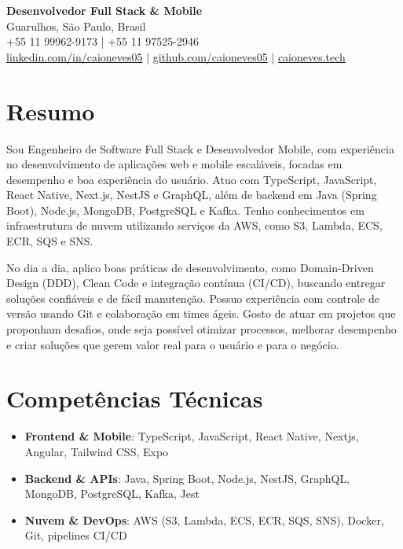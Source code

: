 \documentclass[11pt,letterpaper]{article}
\begin{document}
\begin{center}
    \textbf{\Large Desenvolvedor Full Stack \& Mobile} \\
    \vspace{5pt}
    Guarulhos, São Paulo, Brasil \\
    +55 11 99962-9173 | +55 11 97525-2946 \\
    \href{https://www.linkedin.com/in/caioneves05}{linkedin.com/in/caioneves05} |
    \href{https://github.com/caioneves05}{github.com/caioneves05} |
    \href{http://caioneves.tech}{caioneves.tech}
\end{center}

\section{Resumo}
Sou Engenheiro de Software Full Stack e Desenvolvedor Mobile, com experiência no desenvolvimento de aplicações web e mobile escaláveis, focadas em desempenho e boa experiência do usuário. Atuo com TypeScript, JavaScript, React Native, Next.js, NestJS e GraphQL, além de backend em Java (Spring Boot), Node.js, MongoDB, PostgreSQL e Kafka. Tenho conhecimentos em infraestrutura de nuvem utilizando serviços da AWS, como S3, Lambda, ECS, ECR, SQS e SNS.

No dia a dia, aplico boas práticas de desenvolvimento, como Domain-Driven Design (DDD), Clean Code e integração contínua (CI/CD), buscando entregar soluções confiáveis e de fácil manutenção. Possuo experiência com controle de versão usando Git e colaboração em times ágeis. Gosto de atuar em projetos que proponham desafios, onde seja possível otimizar processos, melhorar desempenho e criar soluções que gerem valor real para o usuário e para o negócio.

\section{Competências Técnicas}
\begin{itemize}[leftmargin=*]
    \item \textbf{Frontend \& Mobile}: TypeScript, JavaScript, React Native, Nextjs, Angular, Tailwind CSS, Expo
    \item \textbf{Backend \& APIs}: Java, Spring Boot, Node.js, NestJS, GraphQL, MongoDB, PostgreSQL, Kafka, Jest
    \item \textbf{Nuvem \& DevOps}: AWS (S3, Lambda, ECS, ECR, SQS, SNS), Docker, Git, pipelines CI/CD
\end{itemize}
\end{document}
